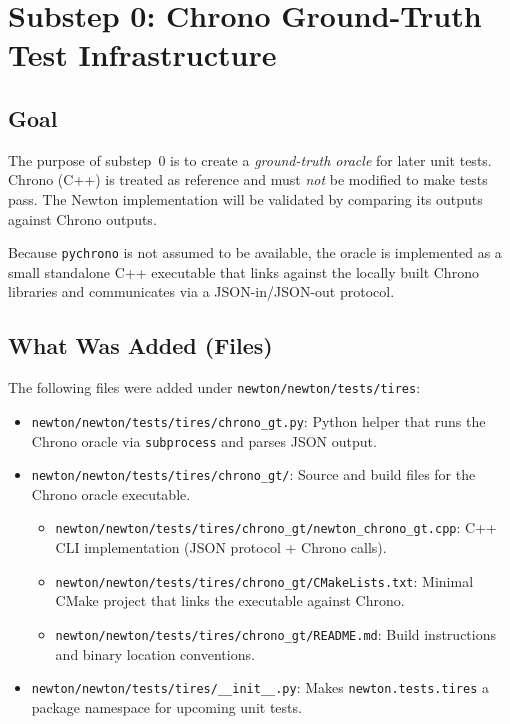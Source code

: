 %
%
%
\section{Substep 0: Chrono Ground-Truth Test Infrastructure}
\label{sec:substep0-chrono-gt}

\subsection{Goal}
The purpose of substep~0 is to create a \emph{ground-truth oracle} for later unit tests.
Chrono (C++) is treated as reference and must \emph{not} be modified to make tests pass.
The Newton implementation will be validated by comparing its outputs against Chrono outputs.

Because \texttt{pychrono} is not assumed to be available, the oracle is implemented as a small
standalone C++ executable that links against the locally built Chrono libraries and communicates
via a JSON-in/JSON-out protocol.

\subsection{What Was Added (Files)}
The following files were added under \texttt{newton/newton/tests/tires}:

\begin{itemize}
  \item \texttt{newton/newton/tests/tires/chrono\_gt.py}:
    Python helper that runs the Chrono oracle via \texttt{subprocess} and parses JSON output.

  \item \texttt{newton/newton/tests/tires/chrono\_gt/}:
    Source and build files for the Chrono oracle executable.

    \begin{itemize}
      \item \texttt{newton/newton/tests/tires/chrono\_gt/newton\_chrono\_gt.cpp}:
        C++ CLI implementation (JSON protocol + Chrono calls).

      \item \texttt{newton/newton/tests/tires/chrono\_gt/CMakeLists.txt}:
        Minimal CMake project that links the executable against Chrono.

      \item \texttt{newton/newton/tests/tires/chrono\_gt/README.md}:
        Build instructions and binary location conventions.
    \end{itemize}

  \item \texttt{newton/newton/tests/tires/\_\_init\_\_.py}:
    Makes \texttt{newton.tests.tires} a package namespace for upcoming unit tests.
\end{itemize}

